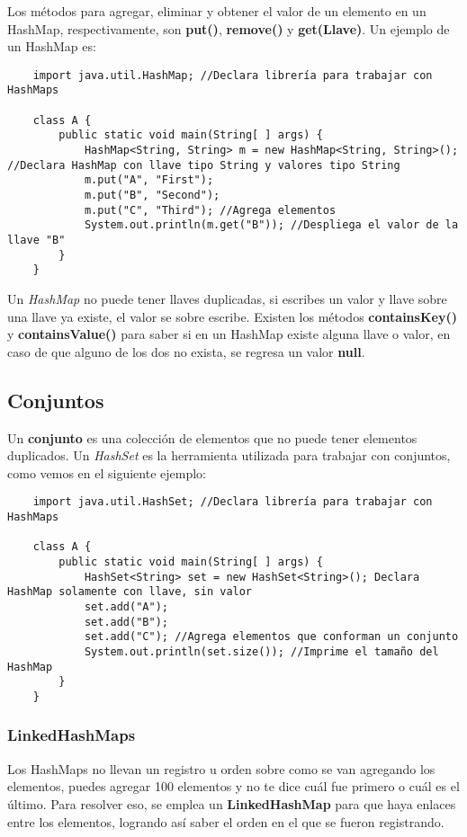 Los métodos para agregar, eliminar y obtener el valor de un elemento en un HashMap, respectivamente, son \textbf{put()}, \textbf{remove()} y \textbf{get(Llave)}. Un ejemplo de un HashMap es:
\begin{lstlisting}
    import java.util.HashMap; //Declara librería para trabajar con HashMaps
    
    class A {
        public static void main(String[ ] args) {
            HashMap<String, String> m = new HashMap<String, String>(); //Declara HashMap con llave tipo String y valores tipo String
            m.put("A", "First");
            m.put("B", "Second");
            m.put("C", "Third"); //Agrega elementos
            System.out.println(m.get("B")); //Despliega el valor de la llave "B"
        }
    }
\end{lstlisting}

Un \textit{HashMap} no puede tener llaves duplicadas, si escribes un valor y llave sobre una llave ya existe, el valor se sobre escribe. Existen los métodos \textbf{containsKey()} y \textbf{containsValue()} para saber si en un HashMap existe alguna llave o valor, en caso de que alguno de los dos no exista, se regresa un valor \textbf{null}.


\subsection{Conjuntos}
\hspace{0.55cm}Un \textbf{conjunto} es una colección de elementos que no puede tener elementos duplicados. Un \textit{HashSet} es la herramienta utilizada para trabajar con conjuntos, como vemos en el siguiente ejemplo:
\begin{lstlisting}
    import java.util.HashSet; //Declara librería para trabajar con HashMaps
    
    class A {
        public static void main(String[ ] args) {
            HashSet<String> set = new HashSet<String>(); Declara HashMap solamente con llave, sin valor
            set.add("A");
            set.add("B");	
            set.add("C"); //Agrega elementos que conforman un conjunto
            System.out.println(set.size()); //Imprime el tamaño del HashMap
        }
    }
\end{lstlisting}


\subsubsection{LinkedHashMaps}
\hspace{0.55cm}Los HashMaps no llevan un registro u orden sobre como se van agregando los elementos, puedes agregar 100 elementos y no te dice cuál fue primero o cuál es el último. Para resolver eso, se emplea un \textbf{LinkedHashMap} para que haya enlaces entre los elementos, logrando así saber el orden en el que se fueron registrando.


